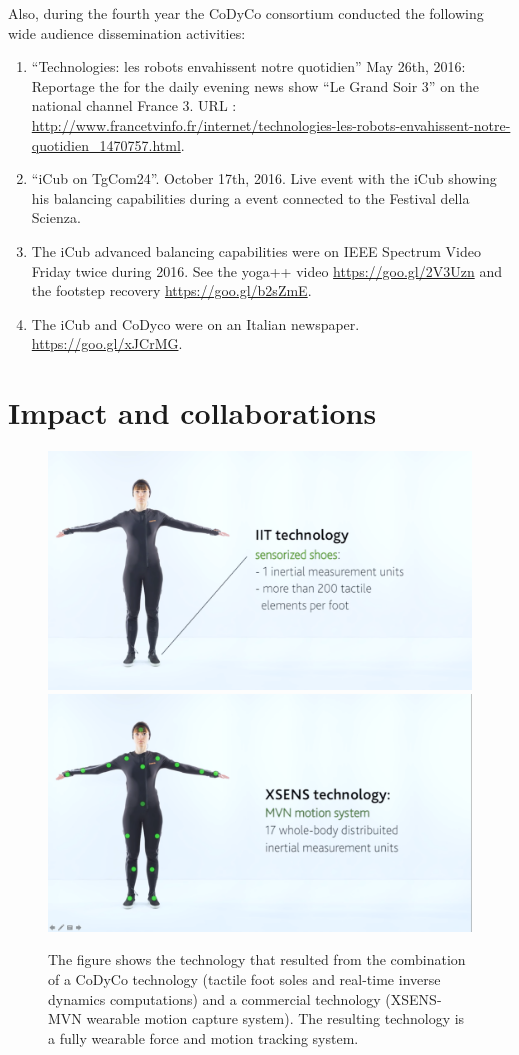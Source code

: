 \documentclass[12pt,a4paper,twoside]{article}
\begin{document}
Also, during the fourth year the CoDyCo consortium conducted the following 
 wide audience dissemination activities:
 
 \begin{enumerate}
 \item ``Technologies: les robots envahissent notre quotidien''
 May 26th, 2016: Reportage the for the daily evening news show ``Le Grand Soir 3'' on the national channel France 3. URL : \url{http://www.francetvinfo.fr/internet/technologies-les-robots-envahissent-notre-quotidien_1470757.html}.
 
 \item ``iCub on TgCom24''. October 17th, 2016. Live event with the iCub showing his balancing capabilities during
 a event connected to the Festival della Scienza.
 
 \item The iCub advanced balancing capabilities were on IEEE Spectrum Video Friday twice during 2016. 
 See the yoga++ video  
\url{https://goo.gl/2V3Uzn} and the footstep recovery  \url{https://goo.gl/b2sZmE}.

\item The iCub and CoDyco were on an Italian newspaper. \url{https://goo.gl/xJCrMG}.

 \end{enumerate}

\section{Impact and collaborations}

\begin{figure}
  \centering
    \includegraphics[height=.25\textwidth]{images/AnDy-IIT}
    \hspace{1cm}
    \includegraphics[height=.25\textwidth]{images/AnDy-XSENS}
  \caption{The figure shows the technology that resulted from the
  combination of a CoDyCo technology (tactile foot soles and real-time
  inverse dynamics computations) and a commercial technology
  (XSENS-MVN wearable motion capture system). The resulting technology
  is a fully wearable force and motion tracking system.}
 \label{fig:XSENS_IIT}
\end{figure}
\end{document}
